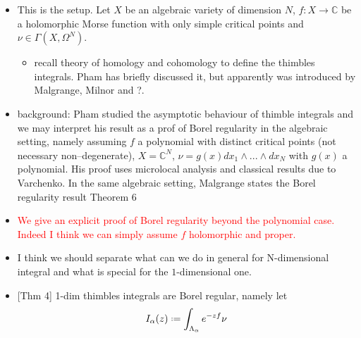 \documentclass{article}
\theoremstyle{definition}
\newcommand{\C}{\mathbb{C}}
\newcommand*{\defeq}{\mathrel{\vcenter{\baselineskip0.5ex \lineskiplimit0pt
                     \hbox{\scriptsize.}\hbox{\scriptsize.}}}%
                     =}
\begin{document}
\begin{itemize}
\item This is the setup. Let $X$ be an algebraic variety of dimension $N$, $f\colon X\to \mathbb{C}$ be a holomorphic Morse function with only simple critical points and $\nu\in\Gamma(X,\Omega^N)$.
\begin{itemize}
\item recall theory of homology and cohomology to define the thimbles integrals. Pham has briefly discussed it, but apparently was introduced by Malgrange, Milnor and ?.  
\end{itemize} 
\item background: Pham studied the asymptotic behaviour of thimble integrals and we may interpret his result as a prof of Borel regularity in the algebraic setting, namely assuming $f$ a polynomial with distinct critical points (not necessary non--degenerate), $X=\C^N$, $\nu=g(x)dx_1\wedge...\wedge dx_N$ with $g(x)$ a polynomial. His proof uses microlocal analysis and classical results due to Varchenko. In the same algebraic setting, Malgrange states the Borel regularity result Theorem 6 \cite{Malgrange22} 
\item \textcolor{red}{We give an explicit proof of Borel regularity beyond the polynomial case. Indeed I think we can simply assume $f$ holomorphic and proper.}
\item I think we should separate what can we do in general for N-dimensional integral and what is special for the $1$-dimensional one. 
\item {[Thm 4]} 1-dim thimbles integrals are Borel regular, namely let 
\begin{equation}
I_{\alpha}(z)\defeq\int_{\Lambda_\alpha}e^{-zf}\nu
\end{equation}


\end{itemize}
\end{document}
